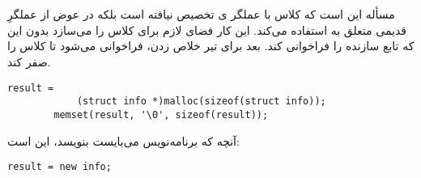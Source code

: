 \section{}
\paragraph{}\label{answer:98}
مسأله این است که کلاس با عملگر ی  تخصیص نیافته است بلکه در عوض از عملگرِ قدیمی  متعلق به  استفاده می‌کند. این کار فضای لازم برای کلاس را می‌سازد بدون این که تابع سازنده را فراخوانی کند. بعد برای تیر خلاص زدن،  فراخوانی می‌شود تا کلاس را صفر کند.
\begin{LTR}
    \begin{lstlisting}[style=C++Style]
        result =
            (struct info *)malloc(sizeof(struct info));
        memset(result, '\0', sizeof(result));
    \end{lstlisting}
\end{LTR}

آنچه که برنامه‌نویس می‌بایست بنویسد، این است:
\begin{LTR}
    \begin{lstlisting}[style=C++Style]
        result = new info;
    \end{lstlisting}
\end{LTR}
